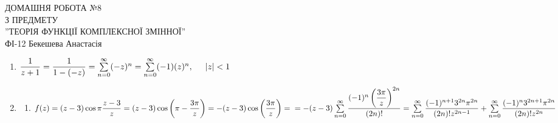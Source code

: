 \documentclass[a4paper,12pt]{article}
\makeatletter
\newcommand{\skipitems}[1]{%
  \addtocounter{\@enumctr}{#1}%
}
\newcommand\tab[1][0.5cm]{\hspace*{#1}}
\makeatother
\begin{document}
	\begin{justify}
		\thispagestyle{empty}\setlength{\parindent}{0pt}
 		\vspace*{\fill}
  		\begin{center}
  			\noindent\makebox[\linewidth]{\rule{\paperwidth}{0.4pt}}
   			\LARGE{\bigbreak ДОМАШНЯ РОБОТА №8\\З ПРЕДМЕТУ\\''ТЕОРІЯ ФУНКЦІЇ КОМПЛЕКСНОЇ ЗМІННОЇ''\\\bigbreak} 
   			ФІ-12 Бекешева Анастасія 
   			\noindent\makebox[\linewidth]{\rule{\paperwidth}{0.4pt}}
  		\end{center}
 		\vspace*{\fill}\newpage
 		\begin{enumerate}
 			\item $\dfrac{1}{z+1}=\dfrac{1}{1-(-z)}=\sum\limits_{n=0}^\infty(-z)^n=\sum\limits_{n=0}^\infty(-1)(z)^n,\tab |z|<1\\$
 				\begin{figure*}[htp]\centering
 				\end{figure*}
 			\skipitems{1}
 			\item \begin{enumerate} 
 				\skipitems{2} 
 				\item $f(z)=(z-3)\cos\pi\dfrac{z-3}{z}=(z-3)\cos\left(\pi-\dfrac{3\pi}{z}\right)=-(z-3)\cos\left(\dfrac{3\pi}{z}\right)=\\=-(z-3)\sum\limits_{n=0}^\infty\dfrac{(-1)^n\left(\dfrac{3\pi}z\right)^{2n}}{(2n)!}=\sum\limits_{n=0}^\infty\dfrac{(-1)^{n+1}3^{2n}\pi^{2n}}{(2n)!z^{2n-1}}+\sum\limits_{n=0}^\infty\dfrac{(-1)^{n}3^{2n+1}\pi^{2n}}{(2n)!z^{2n}}$
 			\end{enumerate}
 		\end{enumerate}
 	\end{justify}
\end{document}

